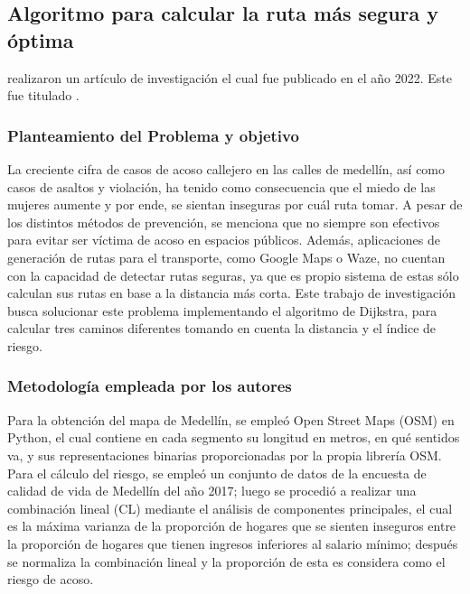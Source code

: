 \subsection{Algoritmo para calcular la ruta más segura y óptima \citep*{pr_dehghani2018copper}}
\citeauthor{pr_dehghani2018copper} realizaron un artículo de investigación el cual fue publicado en el año 2022. Este fue titulado .

\subsubsection{Planteamiento del Problema y objetivo }
La creciente cifra de casos de acoso callejero en las calles de medellín, así como casos de asaltos y violación, ha tenido como consecuencia que el miedo de las mujeres aumente y por ende, se sientan inseguras por cuál ruta tomar. A pesar de los distintos métodos de prevención, se menciona que no siempre son efectivos para evitar ser víctima de acoso en espacios públicos. Además, aplicaciones de generación de rutas para el transporte, como Google Maps o Waze, no cuentan con la capacidad de detectar rutas seguras, ya que es propio sistema de estas sólo calculan sus rutas en base a la distancia más corta. Este trabajo de investigación busca solucionar este problema implementando el algoritmo de Dijkstra, para calcular tres caminos diferentes tomando en cuenta la distancia y el índice de riesgo.

\subsubsection{Metodología empleada por los autores}
Para la obtención del mapa de Medellín, se empleó Open Street Maps (OSM) en Python, el cual contiene en cada segmento su longitud en metros, en qué sentidos va, y sus representaciones binarias proporcionadas por la propia librería OSM. Para el cálculo del riesgo, se empleó un conjunto de datos de la encuesta de calidad de vida de Medellín del año 2017; luego se procedió a realizar una combinación lineal (CL)  mediante el análisis de componentes principales, el cual  es la máxima varianza de la proporción de hogares que se sienten inseguros entre la proporción de hogares que tienen ingresos inferiores al salario mínimo; después se normaliza la combinación lineal y la proporción de esta es considera como el riesgo de acoso.

